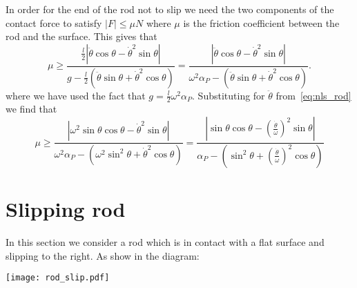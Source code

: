 \documentclass{report}
\begin{document}
In order for the end of the rod not to slip we need the two components of the
contact force to satisfy $|F| \le \mu N$ where $\mu$ is the friction
coefficient between the rod and the surface. This gives that
\begin{equation*}
  \mu \ge \frac
    { \frac{l}{2} |\ddot{\theta}\cos\theta - \dot{\theta}^2\sin\theta| }
    { g-\frac{l}{2} (\ddot{\theta}\sin\theta + \dot{\theta}^2\cos\theta) }
    = \frac
    { |\ddot{\theta}\cos\theta - \dot{\theta}^2\sin\theta| }
    { \omega^2 \alpha_P - (\ddot{\theta}\sin\theta + \dot{\theta}^2\cos\theta) }.
\end{equation*}
where we have used the fact that $g=\frac{l}{2}\omega^2\alpha_P$.
Substituting for $\ddot{\theta}$ from~\eqref{eq:nls_rod} we find that
\begin{equation*}
  \mu \ge \frac
  { |\omega^2\sin{\theta}\cos{\theta} - \dot{\theta}^2\sin{\theta} | }
  { \omega^2 \alpha_P - (\omega^2 \sin^2{\theta} + \dot{\theta}^2\cos{\theta}) }
  = \frac
  { |\sin{\theta}\cos{\theta} - (\tfrac{\dot{\theta}}{\omega})^2\sin{\theta} | }
  { \alpha_P - (\sin^2{\theta} + (\tfrac{\dot{\theta}}{\omega})^2\cos{\theta}) }
\end{equation*}


\section{Slipping rod}

In this section we consider a rod which is in contact with a flat surface and
slipping to the right. As show in the diagram:
\newline
\begin{center}
  \texttt{[image: rod\_slip.pdf]}
\end{center}
\end{document}
